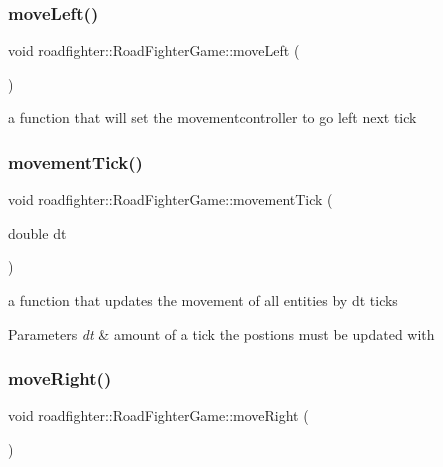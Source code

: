 \subsubsection{\texorpdfstring{move\+Left()}{moveLeft()}}
{\footnotesize\ttfamily void roadfighter\+::\+Road\+Fighter\+Game\+::move\+Left (\begin{DoxyParamCaption}{ }\end{DoxyParamCaption})}

a function that will set the movementcontroller to go left next tick \mbox{\label{classroadfighter_1_1RoadFighterGame_aa9b7ba207f49c736dd933b51096a25a9}} 
\subsubsection{\texorpdfstring{movement\+Tick()}{movementTick()}}
{\footnotesize\ttfamily void roadfighter\+::\+Road\+Fighter\+Game\+::movement\+Tick (\begin{DoxyParamCaption}\item[{double}]{dt }\end{DoxyParamCaption})}

a function that updates the movement of all entities by dt ticks 
\begin{DoxyParams}{Parameters}
{\em dt} & amount of a tick the postions must be updated with \\
\hline
\end{DoxyParams}
\mbox{\label{classroadfighter_1_1RoadFighterGame_a13918572292880c85b13fe2a367dde22}} 
\subsubsection{\texorpdfstring{move\+Right()}{moveRight()}}
{\footnotesize\ttfamily void roadfighter\+::\+Road\+Fighter\+Game\+::move\+Right (\begin{DoxyParamCaption}{ }\end{DoxyParamCaption})}


